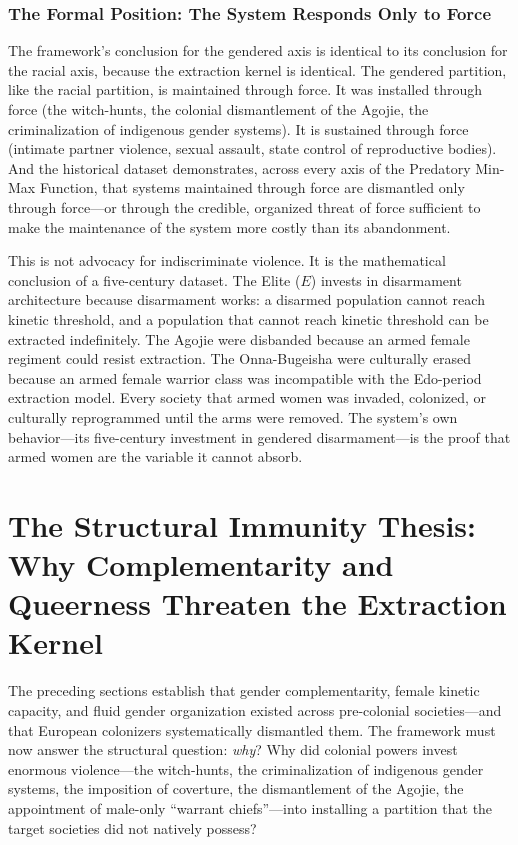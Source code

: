\documentclass[12pt,openany]{book}
\begin{document}
\subsubsection{The Formal Position: The System Responds Only to Force}

The framework's conclusion for the gendered axis is identical to its conclusion for the racial axis, because the extraction kernel is identical. The gendered partition, like the racial partition, is maintained through force. It was installed through force (the witch-hunts, the colonial dismantlement of the Agojie, the criminalization of indigenous gender systems). It is sustained through force (intimate partner violence, sexual assault, state control of reproductive bodies). And the historical dataset demonstrates, across every axis of the Predatory Min-Max Function, that systems maintained through force are dismantled only through force---or through the credible, organized threat of force sufficient to make the maintenance of the system more costly than its abandonment.

This is not advocacy for indiscriminate violence. It is the mathematical conclusion of a five-century dataset. The Elite ($E$) invests in disarmament architecture because disarmament works: a disarmed population cannot reach kinetic threshold, and a population that cannot reach kinetic threshold can be extracted indefinitely. The Agojie were disbanded because an armed female regiment could resist extraction. The Onna-Bugeisha were culturally erased because an armed female warrior class was incompatible with the Edo-period extraction model. Every society that armed women was invaded, colonized, or culturally reprogrammed until the arms were removed. The system's own behavior---its five-century investment in gendered disarmament---is the proof that armed women are the variable it cannot absorb.

\section{The Structural Immunity Thesis: Why Complementarity and Queerness Threaten the Extraction Kernel}

The preceding sections establish that gender complementarity, female kinetic capacity, and fluid gender organization existed across pre-colonial societies---and that European colonizers systematically dismantled them. The framework must now answer the structural question: \textit{why}? Why did colonial powers invest enormous violence---the witch-hunts, the criminalization of indigenous gender systems, the imposition of coverture, the dismantlement of the Agojie, the appointment of male-only ``warrant chiefs''---into installing a partition that the target societies did not natively possess?
\end{document}
